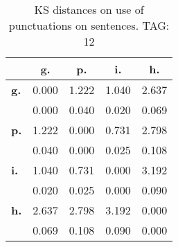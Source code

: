 \begin{table}[h!]
\begin{center}
\begin{tabular}{| l || c | c | c | c |}\hline
 & {\bf g.} & {\bf p.} & {\bf i.} & {\bf h.} \\\hline\hline
{\bf g.} & 0.000 & 1.222 & 1.040 & 2.637 \\
{\bf } & 0.000 & 0.040 & 0.020 & 0.069 \\\hline
{\bf p.} & 1.222 & 0.000 & 0.731 & 2.798 \\
{\bf } & 0.040 & 0.000 & 0.025 & 0.108 \\\hline
{\bf i.} & 1.040 & 0.731 & 0.000 & 3.192 \\
{\bf } & 0.020 & 0.025 & 0.000 & 0.090 \\\hline
{\bf h.} & 2.637 & 2.798 & 3.192 & 0.000 \\
{\bf } & 0.069 & 0.108 & 0.090 & 0.000 \\\hline
\end{tabular}
\caption{KS distances on use of punctuations on sentences. TAG: 12}
\end{center}
\end{table}
